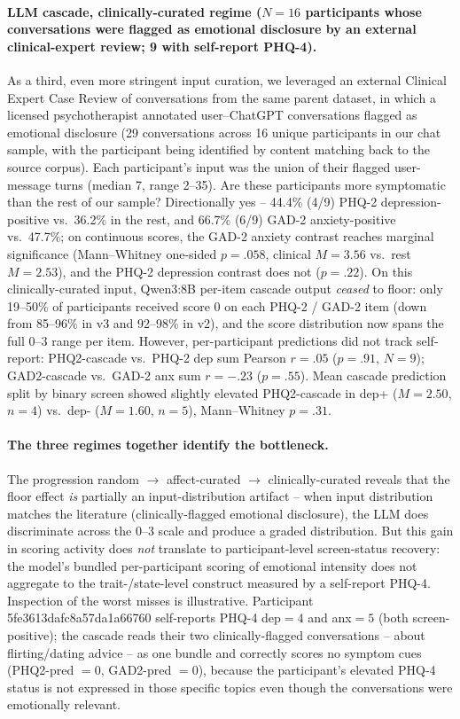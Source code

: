\documentclass[letterpaper]{article}
\begin{document}
\paragraph{LLM cascade, clinically-curated regime ($N=16$ participants whose conversations were flagged as emotional disclosure by an external clinical-expert review; 9 with self-report PHQ-4).} As a third, even more stringent input curation, we leveraged an external Clinical Expert Case Review of conversations from the same parent dataset, in which a licensed psychotherapist annotated user--ChatGPT conversations flagged as emotional disclosure (29 conversations across 16 unique participants in our chat sample, with the participant being identified by content matching back to the source corpus). Each participant's input was the union of their flagged user-message turns (median 7, range 2--35). Are these participants more symptomatic than the rest of our sample? Directionally yes -- 44.4\% (4/9) PHQ-2 depression-positive vs.\ 36.2\% in the rest, and 66.7\% (6/9) GAD-2 anxiety-positive vs.\ 47.7\%; on continuous scores, the GAD-2 anxiety contrast reaches marginal significance (Mann--Whitney one-sided $p=.058$, clinical $M=3.56$ vs.\ rest $M=2.53$), and the PHQ-2 depression contrast does not ($p=.22$). On this clinically-curated input, Qwen3:8B per-item cascade output \emph{ceased} to floor: only 19--50\% of participants received score 0 on each PHQ-2 / GAD-2 item (down from 85--96\% in v3 and 92--98\% in v2), and the score distribution now spans the full 0--3 range per item. However, per-participant predictions did not track self-report: PHQ2-cascade vs.\ PHQ-2 dep sum Pearson $r=.05$ ($p=.91$, $N=9$); GAD2-cascade vs.\ GAD-2 anx sum $r=-.23$ ($p=.55$). Mean cascade prediction split by binary screen showed slightly elevated PHQ2-cascade in dep+ ($M=2.50$, $n=4$) vs.\ dep- ($M=1.60$, $n=5$), Mann--Whitney $p=.31$.

\paragraph{The three regimes together identify the bottleneck.} The progression random $\to$ affect-curated $\to$ clinically-curated reveals that the floor effect \emph{is} partially an input-distribution artifact -- when input distribution matches the literature (clinically-flagged emotional disclosure), the LLM does discriminate across the 0--3 scale and produce a graded distribution. But this gain in scoring activity does \emph{not} translate to participant-level screen-status recovery: the model's bundled per-participant scoring of emotional intensity does not aggregate to the trait-/state-level construct measured by a self-report PHQ-4. Inspection of the worst misses is illustrative. Participant 5fe3613dafc8a57da1a66760 self-reports PHQ-4 dep$=4$ and anx$=5$ (both screen-positive); the cascade reads their two clinically-flagged conversations -- about flirting/dating advice -- as one bundle and correctly scores no symptom cues (PHQ2-pred $=0$, GAD2-pred $=0$), because the participant's elevated PHQ-4 status is not expressed in those specific topics even though the conversations were emotionally relevant.
\end{document}

